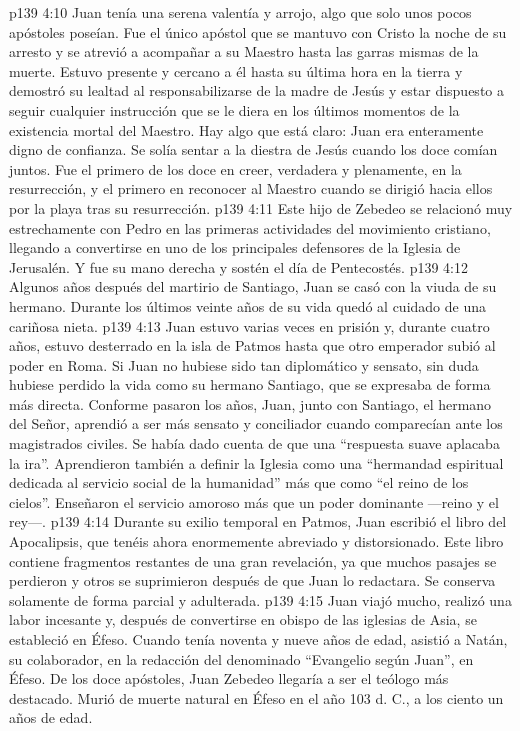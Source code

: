 \vs p139 4:10 Juan tenía una serena valentía y arrojo, algo que solo unos pocos apóstoles poseían. Fue el único apóstol que se mantuvo con Cristo la noche de su arresto y se atrevió a acompañar a su Maestro hasta las garras mismas de la muerte. Estuvo presente y cercano a él hasta su última hora en la tierra y demostró su lealtad al responsabilizarse de la madre de Jesús y estar dispuesto a seguir cualquier instrucción que se le diera en los últimos momentos de la existencia mortal del Maestro. Hay algo que está claro: Juan era enteramente digno de confianza. Se solía sentar a la diestra de Jesús cuando los doce comían juntos. Fue el primero de los doce en creer, verdadera y plenamente, en la resurrección, y el primero en reconocer al Maestro cuando se dirigió hacia ellos por la playa tras su resurrección.
\vs p139 4:11 Este hijo de Zebedeo se relacionó muy estrechamente con Pedro en las primeras actividades del movimiento cristiano, llegando a convertirse en uno de los principales defensores de la Iglesia de Jerusalén. Y fue su mano derecha y sostén el día de Pentecostés.
\vs p139 4:12 Algunos años después del martirio de Santiago, Juan se casó con la viuda de su hermano. Durante los últimos veinte años de su vida quedó al cuidado de una cariñosa nieta.
\vs p139 4:13 Juan estuvo varias veces en prisión y, durante cuatro años, estuvo desterrado en la isla de Patmos hasta que otro emperador subió al poder en Roma. Si Juan no hubiese sido tan diplomático y sensato, sin duda hubiese perdido la vida como su hermano Santiago, que se expresaba de forma más directa. Conforme pasaron los años, Juan, junto con Santiago, el hermano del Señor, aprendió a ser más sensato y conciliador cuando comparecían ante los magistrados civiles. Se había dado cuenta de que una “respuesta suave aplacaba la ira”. Aprendieron también a definir la Iglesia como una “hermandad espiritual dedicada al servicio social de la humanidad” más que como “el reino de los cielos”. Enseñaron el servicio amoroso más que un poder dominante ---reino y el rey---.
\vs p139 4:14 Durante su exilio temporal en Patmos, Juan escribió el libro del Apocalipsis, que tenéis ahora enormemente abreviado y distorsionado. Este libro contiene fragmentos restantes de una gran revelación, ya que muchos pasajes se perdieron y otros se suprimieron después de que Juan lo redactara. Se conserva solamente de forma parcial y adulterada.
\vs p139 4:15 Juan viajó mucho, realizó una labor incesante y, después de convertirse en obispo de las iglesias de Asia, se estableció en Éfeso. Cuando tenía noventa y nueve años de edad, asistió a Natán, su colaborador, en la redacción del denominado “Evangelio según Juan”, en Éfeso. De los doce apóstoles, Juan Zebedeo llegaría a ser el teólogo más destacado. Murió de muerte natural en Éfeso en el año 103 d. C., a los ciento un años de edad.
